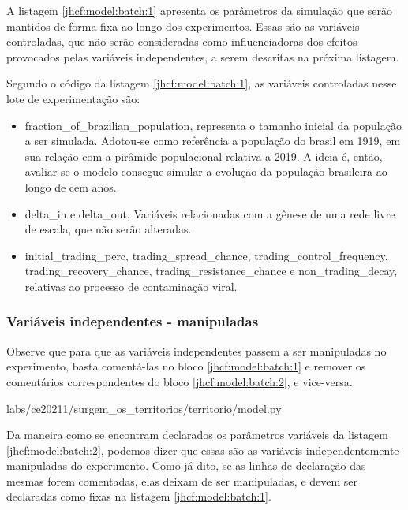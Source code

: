 A listagem \ref{jhcf:model:batch:1} apresenta os parâmetros da simulação que serão mantidos de forma fixa ao longo dos experimentos. Essas são as variáveis controladas, que não serão consideradas como influenciadoras dos efeitos provocados pelas variáveis independentes, a serem descritas na próxima listagem.

Segundo o código da listagem \ref{jhcf:model:batch:1}, as variáveis controladas nesse lote de experimentação são:
\begin{itemize}
\item fraction\_of\_brazilian\_population, representa o tamanho inicial da população a ser simulada. Adotou-se como referência a população do brasil em 1919, em sua relação com a pirâmide populacional relativa a 2019. A ideia é, então, avaliar se o modelo consegue simular a evolução da população brasileira ao longo de cem anos.
\item delta\_in e delta\_out, Variáveis relacionadas com a gênese de uma rede livre de escala, que não serão alteradas.
\item initial\_trading\_perc, trading\_spread\_chance, trading\_control\_frequency, trading\_recovery\_chance, trading\_resistance\_chance e non\_trading\_decay, relativas ao processo de contaminação viral.
\end{itemize}


\subsubsection{Variáveis independentes - manipuladas}

Observe que para que as variáveis independentes passem a ser manipuladas no experimento, basta comentá-las no bloco \ref{jhcf:model:batch:1} e remover os comentários correspondentes do bloco \ref{jhcf:model:batch:2}, e vice-versa.


{labs/ce20211/surgem_os_territorios/territorio/model.py}

Da maneira como se encontram declarados os parâmetros variáveis da listagem \ref{jhcf:model:batch:2}, podemos dizer que essas são as variáveis independentemente manipuladas do experimento. Como já dito, se as linhas de declaração das mesmas forem comentadas, elas deixam de ser manipuladas, e devem ser declaradas como fixas na listagem \ref{jhcf:model:batch:1}.

